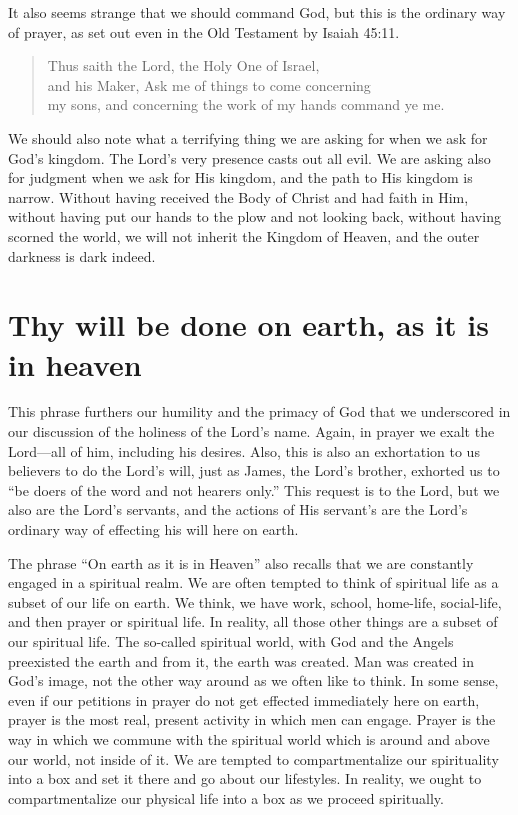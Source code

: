 \documentclass[12pt]{article}
\begin{document}
It also seems strange that we should command God, but this is the ordinary way of prayer, as set out even in the Old Testament by Isaiah 45:11.
\begin{quote}
Thus saith the Lord, the Holy One of Israel, \\
and his Maker, Ask me of things to come concerning \\
my sons, and concerning the work of my hands command ye me.
\end{quote}

We should also note what a terrifying thing we are asking for when we ask for God's kingdom.  The Lord's very presence casts out all evil.  We are asking also for judgment when we ask for His kingdom, and the path to His kingdom is narrow. Without having received the Body of Christ and had faith in Him, without having put our hands to the plow and not looking back, without having scorned the world, we will not inherit the Kingdom of Heaven, and the outer darkness is dark indeed.

\section{Thy will be done on earth, as it is in heaven}

This phrase furthers our humility and the primacy of God that we underscored in our discussion of the holiness of the Lord's name.  Again, in prayer we exalt the Lord---all of him, including his desires.  Also, this is also an exhortation to us believers to do the Lord's will, just as James, the Lord's brother, exhorted us to ``be doers of the word and not hearers only.''  This request is to the Lord, but we also are the Lord's servants, and the actions of His servant's are the Lord's ordinary way of effecting his will here on earth.

The phrase ``On earth as it is in Heaven'' also recalls that we are constantly engaged in a spiritual realm.  We are often tempted to think of spiritual life as a subset of our life on earth.  We think, we have work, school, home-life, social-life, and then prayer or spiritual life.  In reality, all those other things are a subset of our spiritual life.  The so-called spiritual world, with God and the Angels preexisted the earth and from it, the earth was created.  Man was created in God's image, not the other way around as we often like to think.  In some sense, even if our petitions in prayer do not get effected immediately here on earth, prayer is the most real, present activity in which men can engage.  Prayer is the way in which we commune with the spiritual world which is around and above our world, not inside of it.  We are tempted to compartmentalize our spirituality into a box and set it there and go about our lifestyles.  In reality, we ought to compartmentalize our physical life into a box as we proceed spiritually.
\end{document}
